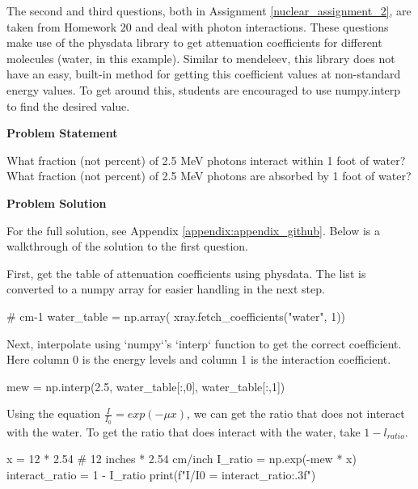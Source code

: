 The second and third questions, both in Assignment \ref{nuclear_assignment_2}, are taken 
from Homework 20 and deal with photon interactions. 
These questions make use of the physdata library to get attenuation coefficients for different
molecules (water, in this example). Similar to mendeleev, this library does not have an easy, 
built-in method for getting this coefficient values at non-standard energy values. To get around
this, students are encouraged to use numpy.interp to find the desired value.

\label{nuclear_assignment_2}

\begin{tcolorbox}[breakable, enhanced jigsaw, title=NE 495: Assignment \ref{nuclear_assignment_2}, 
    colframe=ksu-purple, colback=ksu-gray]

    \textbf{Problem Statement}
    \parindent15pt

    What fraction (not percent) of 2.5 MeV photons interact within 1 foot of water? What fraction 
    (not percent) of 2.5 MeV photons are absorbed by 1 foot of water?

    \tcblower
    \textbf{Problem Solution}
    \parindent15pt
    
    For the full solution, see Appendix \ref{appendix:appendix_github}. Below is a walkthrough
    of the solution to the first question.

    First, get the table of attenuation coefficients using physdata. The list is converted to 
    a numpy array for easier handling in the next step.

\begin{python}
# cm-1
water_table = np.array(
    xray.fetch_coefficients("water", 1))
\end{python}

Next, interpolate using `numpy`'s `interp` function to get the correct coefficient. Here column 
0 is the energy levels and column 1 is the interaction coefficient.

\begin{python}
mew = np.interp(2.5, water_table[:,0], water_table[:,1])
\end{python}

Using the equation $ \frac{I}{I_0} = exp(-\mu x) $, we can get the ratio that does not 
interact with the water. To get the ratio that does interact with the water, take 
$ 1 - l_{ratio} $.

\begin{python}
x = 12 * 2.54 # 12 inches * 2.54 cm/inch
I_ratio = np.exp(-mew * x)
interact_ratio = 1 - I_ratio
print(f"I/I0 = {interact_ratio:.3f}")
\end{python}

\end{tcolorbox}

